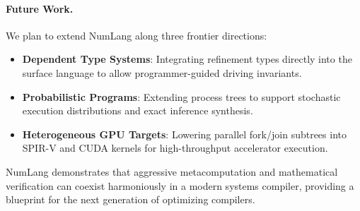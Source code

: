 \paragraph{Future Work.}
We plan to extend NumLang along three frontier directions:
\begin{itemize}
    \item \textbf{Dependent Type Systems}: Integrating refinement types directly into the surface language to allow programmer-guided driving invariants.
    \item \textbf{Probabilistic Programs}: Extending process trees to support stochastic execution distributions and exact inference synthesis.
    \item \textbf{Heterogeneous GPU Targets}: Lowering parallel fork/join subtrees into SPIR-V and CUDA kernels for high-throughput accelerator execution.
\end{itemize}

NumLang demonstrates that aggressive metacomputation and mathematical verification can coexist harmoniously in a modern systems compiler, providing a blueprint for the next generation of optimizing compilers.
